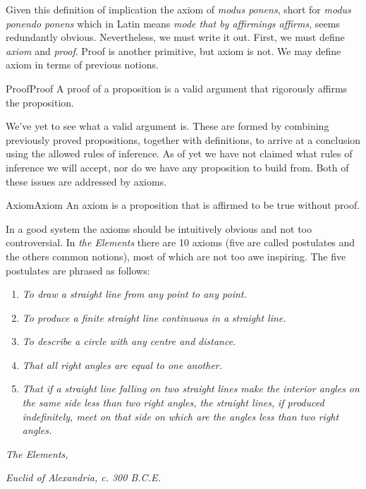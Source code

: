         Given this definition of implication the axiom of \textit{modus ponens},
        short for \textit{modus ponendo ponens} which in Latin means
        \textit{mode that by affirmings affirms}, seems redundantly obvious.
        Nevertheless, we must write it out. First, we must define
        \textit{axiom} and \textit{proof}. Proof is another primitive, but axiom
        is not. We may define axiom in terms of previous notions.
        \begin{fdefinition}{Proof}{Proof}
            A \gls{proof} of a \gls{proposition} is a valid argument that
            rigorously affirms the proposition.
        \end{fdefinition}
        We've yet to see what a valid argument is. These are formed by combining
        previously proved propositions, together with definitions, to arrive at
        a conclusion using the allowed rules of inference. As of yet we have not
        claimed what rules of inference we will accept, nor do we have any
        proposition to build from. Both of these issues are addressed by axioms.
        \begin{fdefinition}{Axiom}{Axiom}
            An \gls{axiom} is a \gls{proposition} that is affirmed to be true
            without \gls{proof}.
        \end{fdefinition}
        In a good system the axioms should be intuitively obvious and not too
        controversial. In \textit{the Elements}
        there are 10 axioms (five are called postulates and the others common
        notions), most of which are not too awe inspiring. The five postulates
        are phrased as follows:
        \begin{center}
            \begin{enumerate}
                \item \textit{To draw a straight line from any point}
                      \textit{to any point.}
                \item \textit{To produce a finite straight line continuous in a}
                      \textit{straight line.}
                \item \textit{To describe a circle with any centre and}
                      \textit{distance.}
                \item \textit{That all right angles are equal to one another.}
                \item \textit{That if a straight line falling on two straight}
                      \textit{lines make the interior angles on the same side}
                      \textit{less than two right angles, the straight lines,}
                      \textit{if produced indefinitely, meet on that side on}
                      \textit{which are the angles less than two right angles.}
            \end{enumerate}
            \hfill\textit{The Elements,}\par
            \hfill\textit{Euclid of Alexandria, c. 300 B.C.E.}
        \end{center}
